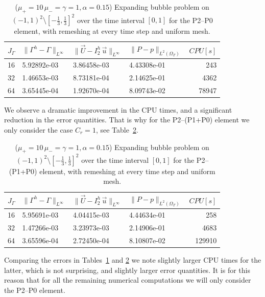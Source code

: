\documentclass[a4paper,11pt,onecolumn]{article}
\newcommand{\errorXx}{\|\Gamma^h - \Gamma\|_{L^\infty}}
\newcommand{\errorUu}[1]{\|\vec U - I^h_{#1}\,\vec u\|_{L^\infty}}
\newcommand{\LerrorPp}{\|P - p\|_{L^2(\Omega_T)}}
\begin{document}
\begin{table}
\center
\begin{tabular}{llllr}
\hline
$J_\Gamma$ & $\errorXx$ & $\errorUu2$ & $\LerrorPp$ & $CPU[s]$\\
\hline
16 & 5.92892e-03 & 3.86458e-03 & 4.43308e-01 &   243 \\
32 & 1.46653e-03 & 8.73181e-04 & 2.14625e-01 &  4362 \\
64 & 3.65445e-04 & 1.92670e-04 & 8.09743e-02 & 78947 \\
\hline
\end{tabular}
\caption{($\mu_+ = 10\,\mu_- = \gamma = 1,\alpha = 0.15$) Expanding bubble
problem on $(-1,1)^2\setminus[-\frac{1}{3},\frac{1}{3}]^2$ over the time
interval $[0,1]$ for the P2--P0 element, with remeshing at every time step and
uniform mesh.}
\label{tab:expandingbubble2Dp2p0remesh}
\end{table}
We observe a dramatic improvement in the CPU times, and a significant reduction
in the error quantities. That is why for the P2--(P1+P0) element we only
consider the case $C_r = 1$, see
Table~\ref{tab:expandingbubble2Dp2p1p0remesh}.
\begin{table}
 \center
\begin{tabular}{llllr}
\hline
$J_\Gamma$ & $\errorXx$ & $\errorUu2$ & $\LerrorPp$ & $CPU[s]$ \\
\hline
16 & 5.95691e-03 & 4.04415e-03 & 4.44634e-01 &    258 \\
32 & 1.47266e-03 & 3.23973e-03 & 2.14906e-01 &   4683 \\
64 & 3.65596e-04 & 2.72450e-04 & 8.10807e-02 & 129910 \\
\hline
\end{tabular}
\caption{($\mu_+ = 10\,\mu_- = \gamma = 1,\alpha = 0.15$) Expanding bubble
problem on $(-1,1)^2\setminus[-\frac{1}{3},\frac{1}{3}]^2$ over the time
interval $[0,1]$ for the P2--(P1+P0) element, with remeshing at every time step
and uniform mesh.}
\label{tab:expandingbubble2Dp2p1p0remesh}
\end{table}
Comparing the errors in Tables~\ref{tab:expandingbubble2Dp2p0remesh} and
\ref{tab:expandingbubble2Dp2p1p0remesh} we note slightly larger CPU times
for the latter, which is not surprising, and slightly larger error quantities.
It is for this reason that for all the remaining numerical computations we will
only consider the P2--P0 element.
\end{document}
